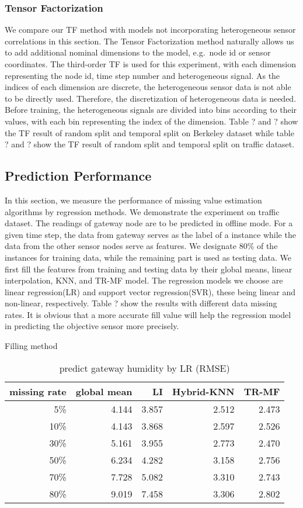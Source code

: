 \subsubsection{Tensor Factorization} %
We compare our TF method with models not incorporating heterogeneous sensor correlations in this section.
The Tensor Factorization method naturally allows us to add additional nominal dimensions to the model, e.g.\ node id or sensor coordinates.
The third-order TF is used for this experiment, with each dimension representing the node id, time step number and heterogeneous signal.  
As the indices of each dimension are discrete, the heterogeneous sensor data is not able to be directly used.
Therefore, the discretization of heterogeneous data is needed.
Before training, the heterogeneous signals are divided into bins according to their values, with each bin representing the index of the dimension.
Table ? and ? show the TF result of random split and temporal split on Berkeley dataset while table ? and ? show the TF result of random split and temporal split on traffic dataset.

\subsection{Prediction Performance}
In this section, we measure the performance of missing value estimation algorithms by regression methods.
We demonstrate the experiment on traffic dataset.
The readings of gateway node are to be predicted in offline mode.
For a given time step, the data from gateway serves as the label of a instance while the data from the other sensor nodes serve as features.
We designate 80\% of the instances for training data, while the remaining part is used as testing data.
We first fill the features from training and testing data by their global means, linear interpolation, KNN, and TR-MF model.
The regression models we choose are linear regression(LR) and support vector regression(SVR), these being linear and non-linear, respectively.
Table ? show the results with different data missing rates.
It is obvious that a more accurate fill value will help the regression model in predicting the objective sensor more precisely.

\begin{table} [htbp]
\setlength{\tabcolsep}{2pt}
\centering
\caption{predict gateway humidity by LR (RMSE) }
\label{table: LR}
   Filling method
\begin{tabular}{ r | r r r r}
        missing rate&global mean     &LI   &Hybrid-KNN &TR-MF\\ \hline
        5\%      &4.144&3.857&2.512&2.473\\
        10\%    &4.143&3.868& 2.597&2.526\\
        30\%    &5.161&3.955&2.773&2.470\\
        50\%    &6.234&4.282&3.158&2.756\\
        70\%   &7.728&5.082&3.310&2.743\\
        80\%   &9.019&7.458&3.306&2.802\\
\end{tabular}
\end{table}

